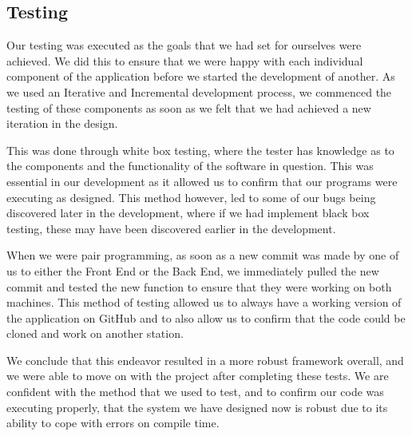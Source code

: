 \subsection{Testing}
Our testing was executed as the goals that we had set for ourselves were achieved. We did this to ensure that we were happy with each individual component of the application before we started the development of another. As we used an Iterative and Incremental development process, we commenced the testing of these components as soon as we felt that we had achieved a new iteration in the design.\par
This was done through white box testing, where the tester has knowledge as to the components and the functionality of the software in question. This was essential in our development as it allowed us to confirm that our programs were executing as designed. This method however, led to some of our bugs being discovered later in the development, where if we had implement black box testing, these may have been discovered earlier in the development. \par 
When we were pair programming, as soon as a new commit was made by one of us to either the Front End or the Back End, we immediately pulled the new commit and tested the new function to ensure that they were working on both machines. This method of testing allowed us to always have a working version of the application on GitHub and to also allow us to confirm that the code could be cloned and work on another station.\par
We conclude that this endeavor resulted in a more robust framework overall, and we were able to move on with the project after completing these tests. We are confident with the method that we used to test, and to confirm our code was executing properly, that the system we have designed now is robust due to its ability to cope with errors on compile time.

